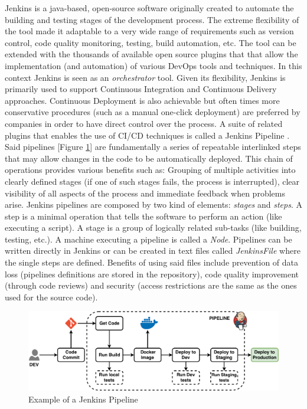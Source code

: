 Jenkins \cite{JenkinsGuide} is a java-based, open-source software originally created to automate the building and testing stages of the development process. The extreme flexibility of the tool made it adaptable to a very wide range of requirements such as version control, code quality monitoring, testing, build automation, etc.
The tool can be extended with the thousands of available open source plugins that that allow the implementation (and automation) of various DevOps tools and techniques. In this context Jenkins is seen as an \textit{orchestrator} tool.
Given its flexibility, Jenkins is primarily used to support Continuous Integration and Continuous Delivery approaches. Continuous Deployment is also achievable but often times more conservative procedures (such as a manual one-click deployment) are preferred by companies in order to have direct control over the process. A suite of related plugins that enables the use of CI/CD techniques is called a Jenkins Pipeline \cite{JenkinsBook}. Said pipelines [Figure \ref{fig:jenkinsPipeline}] are fundamentally a series of repeatable interlinked steps that may allow changes in the code to be automatically deployed. 
This chain of operations provides various benefits such as: Grouping of  multiple activities into clearly defined stages (if one of such stages fails, the process is interrupted), clear visibility of all aspects of the process and immediate feedback when problems arise.
Jenkins pipelines are composed by two kind of elements: \textit{stages} and \textit{steps}. A step is a minimal operation that tells the software to perform an action (like executing a script). A stage is a group of logically related sub-tasks (like building, testing, etc.). A machine executing a pipeline is called a \textit{Node}. Pipelines can be written directly in Jenkins or can be created in text files called \textit{JenkinsFile} where the single steps are defined.
Benefits of using said files include prevention of data loss (pipelines definitions are stored in the repository), code quality improvement (through code reviews) and security (access restrictions are the same as the ones used for the source code).


\begin{figure}[ht]
	\centering
	\includegraphics[scale=0.5]{Images/JenkisPipeline.pdf}
	\caption{Example of a Jenkins Pipeline}
	\label{fig:jenkinsPipeline}
\end{figure}

